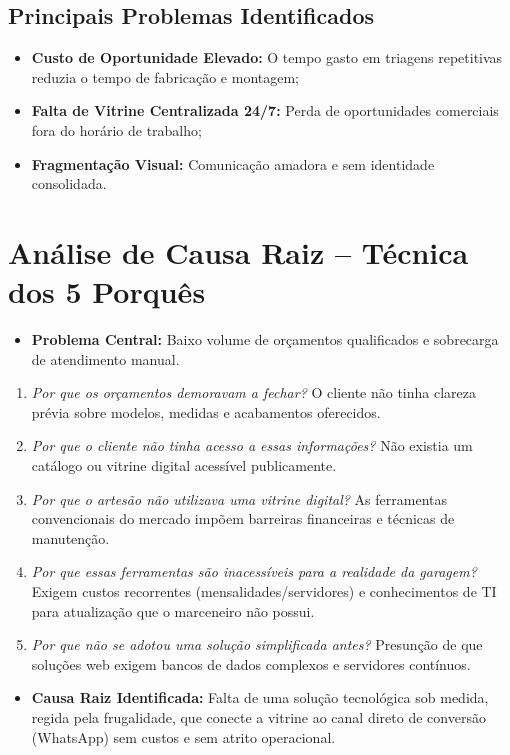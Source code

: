 \documentclass[12pt,a4paper]{article}
\begin{document}
\subsection{Principais Problemas Identificados}
\begin{itemize}[leftmargin=*]
\item \textbf{Custo de Oportunidade Elevado:} O tempo gasto em triagens repetitivas reduzia o tempo de fabricação e montagem;
\item \textbf{Falta de Vitrine Centralizada 24/7:} Perda de oportunidades comerciais fora do horário de trabalho;
\item \textbf{Fragmentação Visual:} Comunicação amadora e sem identidade consolidada.
\end{itemize}



\section{Análise de Causa Raiz -- Técnica dos 5 Porquês}

\begin{itemize}[leftmargin=*]
\item \textbf{Problema Central:} Baixo volume de orçamentos qualificados e sobrecarga de atendimento manual.
\end{itemize}
\begin{enumerate}[leftmargin=*]
\item \textit{Por que os orçamentos demoravam a fechar?} O cliente não tinha clareza prévia sobre modelos, medidas e acabamentos oferecidos.
\item \textit{Por que o cliente não tinha acesso a essas informações?} Não existia um catálogo ou vitrine digital acessível publicamente.
\item \textit{Por que o artesão não utilizava uma vitrine digital?} As ferramentas convencionais do mercado impõem barreiras financeiras e técnicas de manutenção.
\item \textit{Por que essas ferramentas são inacessíveis para a realidade da garagem?} Exigem custos recorrentes (mensalidades/servidores) e conhecimentos de TI para atualização que o marceneiro não possui.
\item \textit{Por que não se adotou uma solução simplificada antes?} Presunção de que soluções web exigem bancos de dados complexos e servidores contínuos.
\end{enumerate}
\begin{itemize}[leftmargin=*]
\item \textbf{Causa Raiz Identificada:} Falta de uma solução tecnológica sob medida, regida pela frugalidade, que conecte a vitrine ao canal direto de conversão (WhatsApp) sem custos e sem atrito operacional.
\end{itemize}
\end{document}
